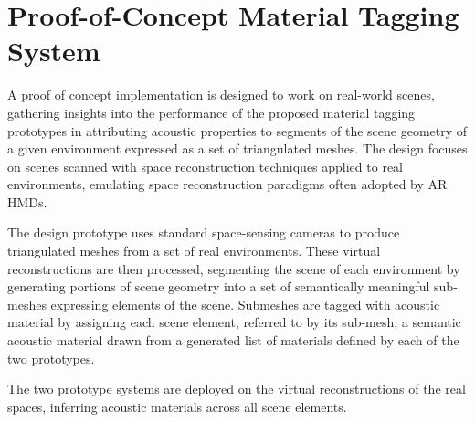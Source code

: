 \chapter{Proof-of-Concept Material Tagging System}
A proof of concept implementation is designed to work on real-world scenes, gathering insights into the performance of the proposed material tagging prototypes in attributing acoustic properties to segments of the scene geometry of a given environment expressed as a set of triangulated meshes. The design focuses on scenes scanned with space reconstruction techniques applied to real environments, emulating space reconstruction paradigms often adopted by AR HMDs.\par
The design prototype uses standard space-sensing cameras to produce triangulated meshes from a set of real environments. These virtual reconstructions are then processed, segmenting the scene of each environment by generating portions of scene geometry into a set of semantically meaningful sub-meshes expressing elements of the scene. Submeshes are tagged with acoustic material by assigning each scene element, referred to by its sub-mesh, a semantic acoustic material drawn from a generated list of materials defined by each of the two prototypes.\par
The two prototype systems are deployed on the virtual reconstructions of the real spaces, inferring acoustic materials across all scene elements. 

